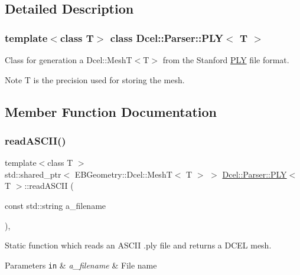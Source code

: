 \subsection{Detailed Description}
\subsubsection*{template$<$class T$>$\newline
class Dcel\+::\+Parser\+::\+P\+L\+Y$<$ T $>$}

Class for generation a Dcel\+::\+Mesh\+T$<$\+T$>$ from the Stanford \hyperlink{classDcel_1_1Parser_1_1PLY}{P\+LY} file format. 

\begin{DoxyNote}{Note}
T is the precision used for storing the mesh. 
\end{DoxyNote}


\subsection{Member Function Documentation}
\mbox{\label{classDcel_1_1Parser_1_1PLY_aaf13b770fe4d9cfc4e419af7418fc35c}} 
\subsubsection{\texorpdfstring{read\+A\+S\+C\+I\+I()}{readASCII()}\hspace{0.1cm}{\footnotesize\ttfamily [1/2]}}
{\footnotesize\ttfamily template$<$class T $>$ \\
std\+::shared\+\_\+ptr$<$ E\+B\+Geometry\+::\+Dcel\+::\+MeshT$<$ T $>$ $>$ \hyperlink{classDcel_1_1Parser_1_1PLY}{Dcel\+::\+Parser\+::\+P\+LY}$<$ T $>$\+::read\+A\+S\+C\+II (\begin{DoxyParamCaption}\item[{const std\+::string}]{a\+\_\+filename }\end{DoxyParamCaption})\hspace{0.3cm}{\ttfamily [inline]}, {\ttfamily [static]}}



Static function which reads an A\+S\+C\+II .ply file and returns a D\+C\+EL mesh. 


\begin{DoxyParams}[1]{Parameters}
\mbox{\tt in}  & {\em a\+\_\+filename} & File name \\
\hline
\end{DoxyParams}
\mbox{\label{classDcel_1_1Parser_1_1PLY_a280f083c1901248de1c69321783ad9d1}} 
